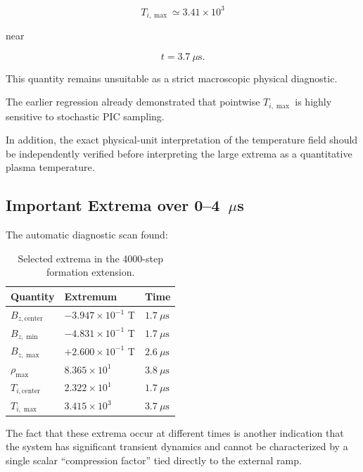 \documentclass[11pt,a4paper]{article}
\begin{document}
\[
T_{i,\max}
\simeq
3.41\times10^3
\]

near

\[
t=3.7~\mu\mathrm{s}.
\]

This quantity remains unsuitable as a strict macroscopic physical diagnostic.

The earlier regression already demonstrated that pointwise
\(T_{i,\max}\) is highly sensitive to stochastic PIC sampling.

In addition, the exact physical-unit interpretation of the temperature field
should be independently verified before interpreting the large extrema as a
quantitative plasma temperature.

\subsection{Important Extrema over 0--4~\texorpdfstring{$\mu$s}{us}}

The automatic diagnostic scan found:

\begin{table}[htbp]
    \centering
    \caption{Selected extrema in the 4000-step formation extension.}
    \begin{tabular}{@{}lll@{}}
        \toprule
        Quantity & Extremum & Time \\
        \midrule
        \(B_{z,\mathrm{center}}\) &
        \(-3.947\times10^{-1}\) T &
        \(1.7~\mu\mathrm{s}\) \\
        \(B_{z,\min}\) &
        \(-4.831\times10^{-1}\) T &
        \(1.7~\mu\mathrm{s}\) \\
        \(B_{z,\max}\) &
        \(+2.600\times10^{-1}\) T &
        \(2.6~\mu\mathrm{s}\) \\
        \(\rho_{\max}\) &
        \(8.365\times10^{1}\) &
        \(3.8~\mu\mathrm{s}\) \\
        \(T_{i,\mathrm{center}}\) &
        \(2.322\times10^{1}\) &
        \(1.7~\mu\mathrm{s}\) \\
        \(T_{i,\max}\) &
        \(3.415\times10^{3}\) &
        \(3.7~\mu\mathrm{s}\) \\
        \bottomrule
    \end{tabular}
\end{table}

The fact that these extrema occur at different times is another indication
that the system has significant transient dynamics and cannot be characterized
by a single scalar ``compression factor'' tied directly to the external ramp.
\end{document}
